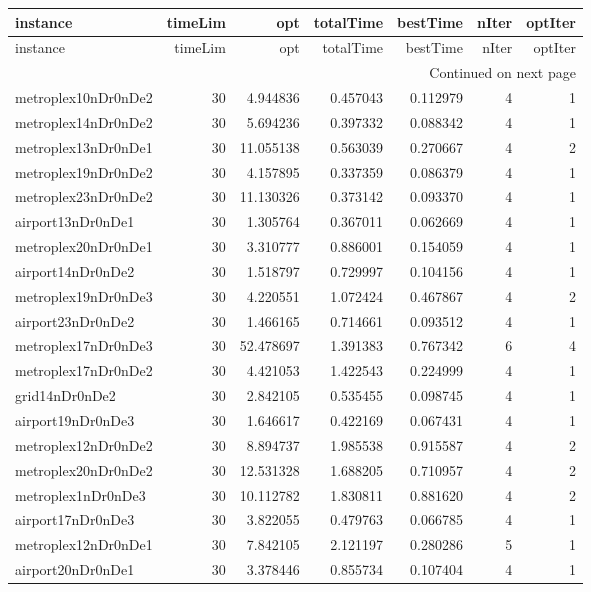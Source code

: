 
\begin{longtable}{|l|r|r|r|r|r|r|}
\toprule
instance & timeLim & opt & totalTime & bestTime & nIter & optIter \\
\midrule
\endfirsthead
\toprule
instance & timeLim & opt & totalTime & bestTime & nIter & optIter \\
\midrule
\endhead
\midrule
\multicolumn{7}{r}{Continued on next page} \\
\midrule
\endfoot
\bottomrule
\endlastfoot
metroplex10nDr0nDe2 & 30 & 4.944836 & 0.457043 & 0.112979 & 4 & 1 \\
metroplex14nDr0nDe2 & 30 & 5.694236 & 0.397332 & 0.088342 & 4 & 1 \\
metroplex13nDr0nDe1 & 30 & 11.055138 & 0.563039 & 0.270667 & 4 & 2 \\
metroplex19nDr0nDe2 & 30 & 4.157895 & 0.337359 & 0.086379 & 4 & 1 \\
metroplex23nDr0nDe2 & 30 & 11.130326 & 0.373142 & 0.093370 & 4 & 1 \\
airport13nDr0nDe1 & 30 & 1.305764 & 0.367011 & 0.062669 & 4 & 1 \\
metroplex20nDr0nDe1 & 30 & 3.310777 & 0.886001 & 0.154059 & 4 & 1 \\
airport14nDr0nDe2 & 30 & 1.518797 & 0.729997 & 0.104156 & 4 & 1 \\
metroplex19nDr0nDe3 & 30 & 4.220551 & 1.072424 & 0.467867 & 4 & 2 \\
airport23nDr0nDe2 & 30 & 1.466165 & 0.714661 & 0.093512 & 4 & 1 \\
metroplex17nDr0nDe3 & 30 & 52.478697 & 1.391383 & 0.767342 & 6 & 4 \\
metroplex17nDr0nDe2 & 30 & 4.421053 & 1.422543 & 0.224999 & 4 & 1 \\
grid14nDr0nDe2 & 30 & 2.842105 & 0.535455 & 0.098745 & 4 & 1 \\
airport19nDr0nDe3 & 30 & 1.646617 & 0.422169 & 0.067431 & 4 & 1 \\
metroplex12nDr0nDe2 & 30 & 8.894737 & 1.985538 & 0.915587 & 4 & 2 \\
metroplex20nDr0nDe2 & 30 & 12.531328 & 1.688205 & 0.710957 & 4 & 2 \\
metroplex1nDr0nDe3 & 30 & 10.112782 & 1.830811 & 0.881620 & 4 & 2 \\
airport17nDr0nDe3 & 30 & 3.822055 & 0.479763 & 0.066785 & 4 & 1 \\
metroplex12nDr0nDe1 & 30 & 7.842105 & 2.121197 & 0.280286 & 5 & 1 \\
airport20nDr0nDe1 & 30 & 3.378446 & 0.855734 & 0.107404 & 4 & 1 \\

\end{longtable}
